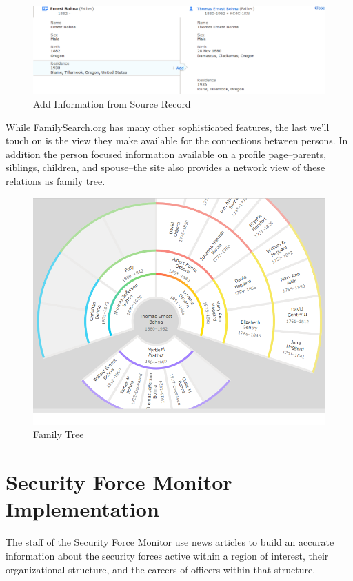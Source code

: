 \documentclass[format=siggraph, review=true]{acmart}
\begin{document}
\begin{figure}[h]
\includegraphics[width=\columnwidth]{images/familysearch/add_info.png}
\caption{Add Information from Source Record}
\label{fig:source-linker}
\end{figure}

While FamilySearch.org has many other sophisticated features, the last
we'll touch on is the view they make available for the connections
between persons. In addition the person focused information available
on a profile page--parents, siblings, children, and
spouse--the site also provides a network view of these relations as
family tree.

\begin{figure}[h]
\includegraphics[width=\columnwidth]{images/familysearch/family_tree.png}
\caption{Family Tree}
\label{fig:source-linker}
\end{figure}

\section*{Security Force Monitor Implementation}
The staff of the Security Force Monitor use news articles to build an
accurate information about the security forces active within a region
of interest, their organizational structure, and the careers of
officers within that structure.
\end{document}
